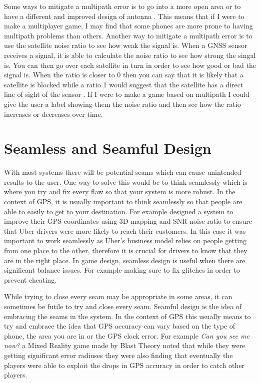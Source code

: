 \documentclass{l4proj}
\begin{document}
Some ways to mitigate a multipath error is to go into a more open area or to have a different and improved design
of antenna \citep{Kos2010}. This means that if I were to make a multiplayer game, I may find that some phones are
more prone to having multipath problems than others. Another way to mitigate a multipath error is to use the 
satellite noise ratio to see how weak the signal is. When a GNSS sensor receives a signal, it is able to calculate 
the noise ratio to see how strong the singal is. You can then go over each satellite in turn in order to see how
good or bad the signal is. When the ratio is closer to 0 then you can say that it is likely that a satellite is blocked
while a ratio 1 would suggest that the satellite has a direct line of sight of the sensor \citep{uberGPS}. If I were
to make a game based on multipath I could give the user a label showing them the noise ratio and then see how the ratio
increases or decreases over time.


\section{Seamless and Seamful Design}
With most systems there will be potential seams which can cause unintended results to the user. One way to solve this would be to think seamlessly which is where you
try and fix every flaw so that your system is more robust. In the context of GPS, it is usually important to think seamlessly
so that people are able to easily to get to your destination. For example \cite{uberGPS} designed a system to improve their
GPS coordinates using 3D mapping and SNR noise ratio to ensure that Uber drivers were more likely to reach their customers. In this
case it was important to work seamlessly as Uber's business model relies on people getting from one place to the other, therefore it
is crucial for drivers to know that they are in the right place. In game design, seamless design is useful when there are significant balance issues. For example making sure to fix
glitches in order to prevent cheating. 

While trying to close every seam may be appropriate in some areas, it can sometimes be futile to try and close every seam.
Seamful design is the idea of embracing the seams in the system. In the context of GPS this usually means to try and embrace
the idea that GPS accuracy can vary based on the type of phone, the area you are in or the GPS clock error. For example 
\emph{Can you see me now?} a Mixed Reality game made by Blast Theory noted that while they were getting significant error radiuses they
were also finding that eventually the players were able to exploit the drops in GPS accuracy in order to catch other players. \citep{canyouseeme}
\end{document}
